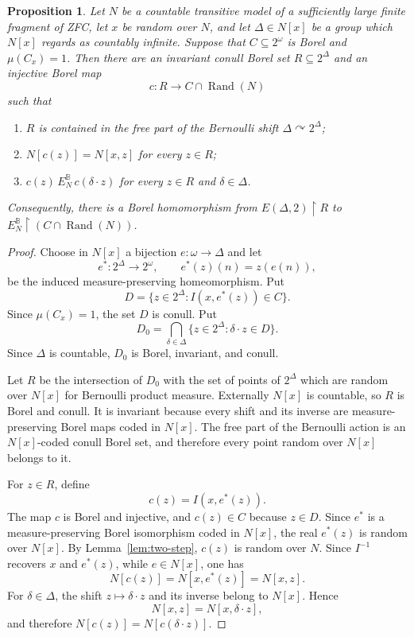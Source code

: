 \documentclass[10pt,a4paper]{amsart}
\newtheorem{proposition}{Proposition}
\newcommand{\B}{\mathbb B}
\newcommand{\Rand}{\operatorname{Rand}}
\newcommand{\restr}{\mathbin{\upharpoonright}}
\begin{document}
\begin{proposition}\label{prop:second-coordinate}
Let $N$ be a countable transitive model of a sufficiently large finite fragment of ZFC, let $x$ be random over $N$, and let $\Delta\in N[x]$ be a group which $N[x]$ regards as countably infinite.  Suppose that $C\subseteq2^\omega$ is Borel and $\mu(C_x)=1$.  Then there are an invariant conull Borel set $R\subseteq2^\Delta$ and an injective Borel map
\[
 c\colon R\longrightarrow C\cap\Rand(N)
\]
such that
\begin{enumerate}
\item $R$ is contained in the free part of the Bernoulli shift $\Delta\curvearrowright2^\Delta$;
\item $N[c(z)]=N[x,z]$ for every $z\in R$;
\item $c(z)\,E_N^{\B}\,c(\delta\cdot z)$ for every $z\in R$ and $\delta\in\Delta$.
\end{enumerate}
Consequently, there is a Borel homomorphism from $E(\Delta,2)\restr R$ to $E_N^{\B}\restr(C\cap\Rand(N))$.
\end{proposition}

\begin{proof}
Choose in $N[x]$ a bijection $e\colon\omega\to\Delta$ and let
\[
 e^*\colon2^\Delta\longrightarrow2^\omega,
 \qquad e^*(z)(n)=z(e(n)),
\]
be the induced measure-preserving homeomorphism.  Put
\[
 D=\{z\in2^\Delta:I(x,e^*(z))\in C\}.
\]
Since $\mu(C_x)=1$, the set $D$ is conull.  Put
\[
 D_0=\bigcap_{\delta\in\Delta}\{z\in2^\Delta:\delta\cdot z\in D\}.
\]
Since $\Delta$ is countable, $D_0$ is Borel, invariant, and conull.

Let $R$ be the intersection of $D_0$ with the set of points of $2^\Delta$ which are random over $N[x]$ for Bernoulli product measure.  Externally $N[x]$ is countable, so $R$ is Borel and conull.  It is invariant because every shift and its inverse are measure-preserving Borel maps coded in $N[x]$.  The free part of the Bernoulli action is an $N[x]$-coded conull Borel set, and therefore every point random over $N[x]$ belongs to it.

For $z\in R$, define
\[
 c(z)=I(x,e^*(z)).
\]
The map $c$ is Borel and injective, and $c(z)\in C$ because $z\in D$.  Since $e^*$ is a measure-preserving Borel isomorphism coded in $N[x]$, the real $e^*(z)$ is random over $N[x]$.  By Lemma~\ref{lem:two-step}, $c(z)$ is random over $N$.  Since $I^{-1}$ recovers $x$ and $e^*(z)$, while $e\in N[x]$, one has
\[
 N[c(z)]=N[x,e^*(z)]=N[x,z].
\]
For $\delta\in\Delta$, the shift $z\mapsto\delta\cdot z$ and its inverse belong to $N[x]$.  Hence
\[
 N[x,z]=N[x,\delta\cdot z],
\]
and therefore $N[c(z)]=N[c(\delta\cdot z)]$.
\end{proof}
\end{document}
